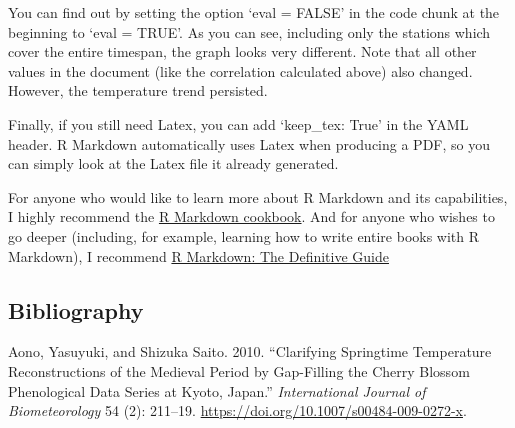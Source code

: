 \documentclass[
  12pt,
]{article}
\newlength{\cslhangindent}
\newenvironment{CSLReferences}[2] %
 {\begin{list}{}{%
  \setlength{\itemindent}{0pt}
  \setlength{\leftmargin}{0pt}
  \setlength{\parsep}{0pt}
  \ifodd #1
   \setlength{\leftmargin}{\cslhangindent}
   \setlength{\itemindent}{-1\cslhangindent}
  \fi
  \setlength{\itemsep}{#2\baselineskip}}}
 {\end{list}}
\begin{document}
You can find out by setting the option `eval = FALSE' in the code chunk
at the beginning to `eval = TRUE'. As you can see, including only the
stations which cover the entire timespan, the graph looks very
different. Note that all other values in the document (like the
correlation calculated above) also changed. However, the temperature
trend persisted.

Finally, if you still need Latex, you can add `keep\_tex: True' in the
YAML header. R Markdown automatically uses Latex when producing a PDF,
so you can simply look at the Latex file it already generated.

For anyone who would like to learn more about R Markdown and its
capabilities, I highly recommend the
\href{https://bookdown.org/yihui/R\%20Markdown-cookbook/}{R Markdown
cookbook}. And for anyone who wishes to go deeper (including, for
example, learning how to write entire books with R Markdown), I
recommend \href{https://bookdown.org/yihui/rmarkdown/}{R Markdown: The
Definitive Guide}

\subsection*{Bibliography}\label{bibliography}

\label{refs}
\begin{CSLReferences}{1}{0}
Aono, Yasuyuki, and Shizuka Saito. 2010. {``Clarifying Springtime
Temperature Reconstructions of the Medieval Period by Gap-Filling the
Cherry Blossom Phenological Data Series at {Kyoto}, {Japan}.''}
\emph{International Journal of Biometeorology} 54 (2): 211--19.
\url{https://doi.org/10.1007/s00484-009-0272-x}.

\end{CSLReferences}
\end{document}
